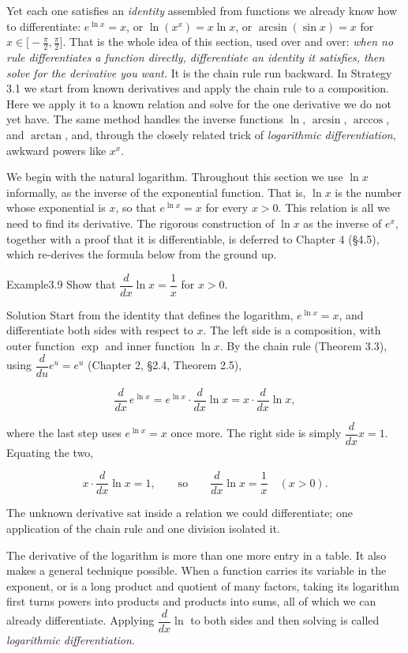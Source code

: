 \documentclass[a4paper,12pt,oneside]{memoir}
\begin{document}
Yet each one satisfies an \emph{identity} assembled from functions we already know how to differentiate: \(e^{\ln x} = x\), or \(\ln(x^{x}) = x\ln x\), or \(\arcsin(\sin x) = x\) for \(x \in \bigl[-\tfrac{\pi}{2}, \tfrac{\pi}{2}\bigr]\). That is the whole idea of this section, used over and over: \emph{when no rule differentiates a function directly, differentiate an identity it satisfies, then solve for the derivative you want.} It is the chain rule run backward. In Strategy 3.1 we start from known derivatives and apply the chain rule to a composition. Here we apply it to a known relation and solve for the one derivative we do not yet have. The same method handles the inverse functions \(\ln\), \(\arcsin\), \(\arccos\), and \(\arctan\), and, through the closely related trick of \emph{logarithmic differentiation}, awkward powers like \(x^{x}\).

We begin with the natural logarithm. Throughout this section we use \(\ln x\) informally, as the inverse of the exponential function. That is, \(\ln x\) is the number whose exponential is \(x\), so that \(e^{\ln x} = x\) for every \(x > 0\). This relation is all we need to find its derivative. The rigorous construction of \(\ln x\) as the inverse of \(e^{x}\), together with a proof that it is differentiable, is deferred to Chapter 4 (§4.5), which re-derives the formula below from the ground up.

\begin{workedexample}
\begin{envexample}{Example}{3.9}{}
Show that \(\dfrac{d}{dx}\ln x = \dfrac{1}{x}\) for \(x > 0\).
\end{envexample}
\begin{envsolution}{Solution}{}{}
Start from the identity that defines the logarithm, \(e^{\ln x} = x\), and differentiate both sides with respect to \(x\). The left side is a composition, with outer function \(\exp\) and inner function \(\ln x\). By the chain rule (Theorem 3.3), using \(\dfrac{d}{du}e^{u} = e^{u}\) (Chapter 2, §2.4, Theorem 2.5),

\[ \frac{d}{dx}\,e^{\ln x} = e^{\ln x}\cdot\frac{d}{dx}\ln x = x\cdot\frac{d}{dx}\ln x, \]

where the last step uses \(e^{\ln x} = x\) once more. The right side is simply \(\dfrac{d}{dx}x = 1\). Equating the two,

\[ x\cdot\frac{d}{dx}\ln x = 1, \qquad\text{so}\qquad \frac{d}{dx}\ln x = \frac{1}{x} \quad (x > 0). \]

The unknown derivative sat inside a relation we could differentiate; one application of the chain rule and one division isolated it.
\end{envsolution}
\end{workedexample}
The derivative of the logarithm is more than one more entry in a table. It also makes a general technique possible. When a function carries its variable in the exponent, or is a long product and quotient of many factors, taking its logarithm first turns powers into products and products into sums, all of which we can already differentiate. Applying \(\dfrac{d}{dx}\ln\) to both sides and then solving is called \emph{logarithmic differentiation}.
\end{document}
